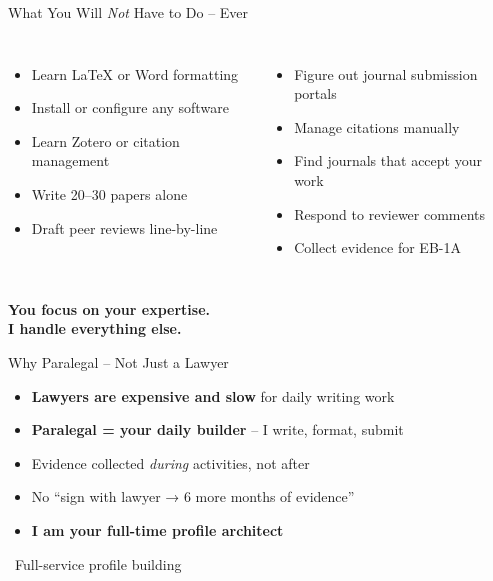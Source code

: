 \documentclass[aspectratio=169, 10pt]{beamer}
\begin{document}
	\begin{frame}{What You Will \textit{Not} Have to Do – Ever}
		\begin{columns}[T]
			\begin{itemize}
				\item Learn LaTeX or Word formatting
				\item Install or configure any software
				\item Learn Zotero or citation management
				\item Write 20–30 papers alone
				\item Draft peer reviews line-by-line
			\end{itemize}
			\begin{itemize}
				\item Figure out journal submission portals
				\item Manage citations manually
				\item Find journals that accept your work
				\item Respond to reviewer comments
				\item Collect evidence for EB-1A
			\end{itemize}
		\end{columns}
		
		\vspace{0.5cm}
		\centering
		\textbf{\Large You focus on your expertise.} \\
		\textbf{\Large I handle everything else.}
	\end{frame}
	
	\begin{frame}{Why Paralegal – Not Just a Lawyer}
		\begin{itemize}
			\item \textbf{Lawyers are expensive and slow} for daily writing work
			\item \textbf{Paralegal = your daily builder} – I write, format, submit
			\item Evidence collected \textit{during} activities, not after
			\item No “sign with lawyer → 6 more months of evidence”
			\item \textbf{I am your full-time profile architect}
		\end{itemize}
		
		\vspace{0.5cm}
		\centering
		\textcolor{navyblue}{\Large \faGavel \  Full-service profile building}
	\end{frame}
	
\end{document}
